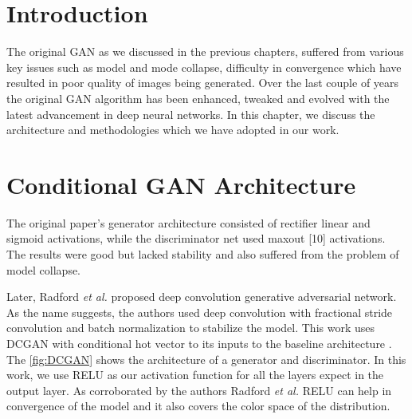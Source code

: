 
\section{Introduction}
The original GAN as we discussed in the previous chapters, suffered from various key issues such as model and mode collapse, difficulty in convergence which have resulted in poor quality of images being generated. Over the last couple of years the original GAN algorithm has been enhanced, tweaked and evolved  with the latest advancement in deep neural networks. In this chapter, we discuss the architecture and methodologies which we have adopted in our work.  


\section{Conditional GAN Architecture} 
The original paper's\cite{Original-GAN} generator architecture consisted of rectifier linear\cite{RELU} and sigmoid activations, while the discriminator net used maxout [10] activations. The results were good but lacked stability and also suffered from the problem of model collapse.
\par
Later, Radford \textit{et al.}\cite{DCGAN} proposed deep convolution generative adversarial network. As the name suggests, the authors used deep convolution with fractional stride convolution and batch normalization to stabilize the model. This work uses DCGAN with conditional hot vector to its inputs to the baseline architecture . The \cref{fig:DCGAN} shows the architecture of a generator and discriminator. In this work, we use RELU as our activation function for all the layers expect in the output layer. As corroborated by the authors Radford \textit{et al.}\cite{DCGAN} RELU can help in convergence of the model and it also covers the color space of the distribution.
